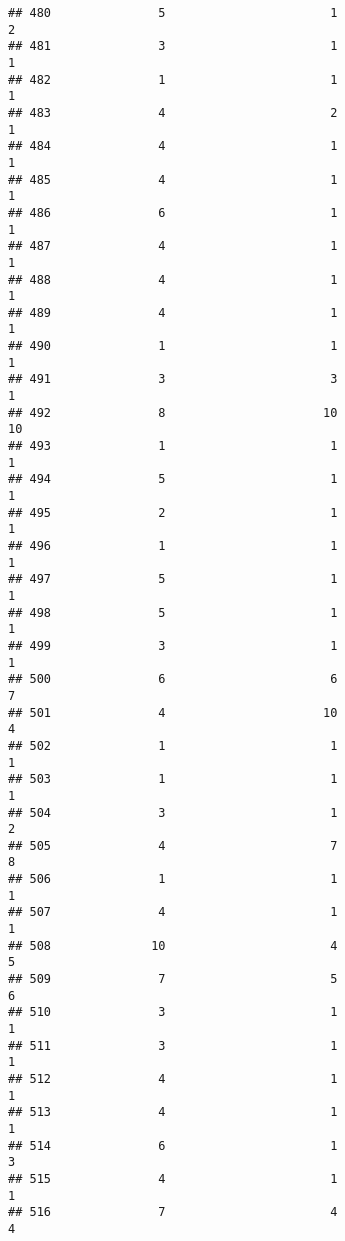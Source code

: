 \documentclass[
]{article}
\begin{document}
\begin{verbatim}
## 480               5                       1                        2
## 481               3                       1                        1
## 482               1                       1                        1
## 483               4                       2                        1
## 484               4                       1                        1
## 485               4                       1                        1
## 486               6                       1                        1
## 487               4                       1                        1
## 488               4                       1                        1
## 489               4                       1                        1
## 490               1                       1                        1
## 491               3                       3                        1
## 492               8                      10                       10
## 493               1                       1                        1
## 494               5                       1                        1
## 495               2                       1                        1
## 496               1                       1                        1
## 497               5                       1                        1
## 498               5                       1                        1
## 499               3                       1                        1
## 500               6                       6                        7
## 501               4                      10                        4
## 502               1                       1                        1
## 503               1                       1                        1
## 504               3                       1                        2
## 505               4                       7                        8
## 506               1                       1                        1
## 507               4                       1                        1
## 508              10                       4                        5
## 509               7                       5                        6
## 510               3                       1                        1
## 511               3                       1                        1
## 512               4                       1                        1
## 513               4                       1                        1
## 514               6                       1                        3
## 515               4                       1                        1
## 516               7                       4                        4

\end{verbatim}
\end{document}
